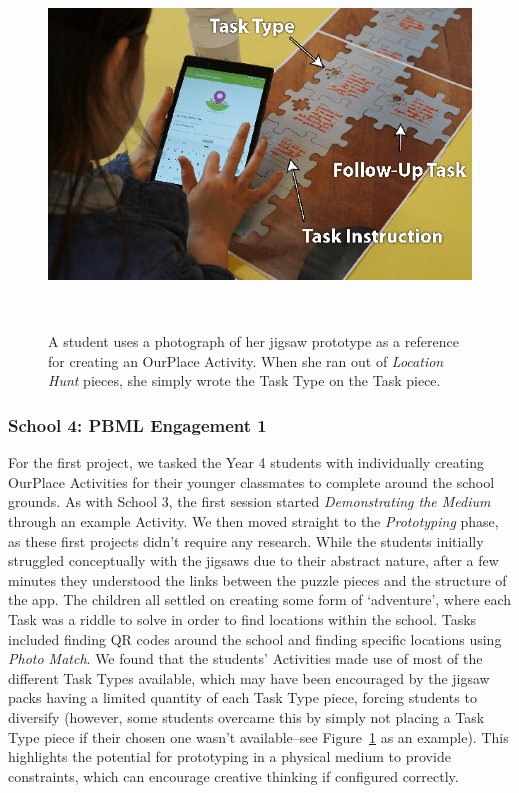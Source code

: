 \begin{figure}
\centering
  \includegraphics[width=0.7\columnwidth]{images/chapter08/jigsawToApp}
  \caption[A student referring to her paper prototype]{A student uses a photograph of her jigsaw prototype as a reference for creating an OurPlace Activity. When she ran out of \textit{Location Hunt} pieces, she simply wrote the Task Type on the Task piece.}~\label{fig:JigsawToApp}
\end{figure}

\subsubsection{School 4: PBML Engagement 1}
For the first project, we tasked the Year 4 students with individually creating OurPlace Activities for their younger classmates to complete around the school grounds. As with School 3, the first session started \textit{Demonstrating the Medium} through an example Activity. We then moved straight to the \textit{Prototyping} phase, as these first projects didn't require any research. While the students initially struggled conceptually with the jigsaws due to their abstract nature, after a few minutes they understood the links between the puzzle pieces and the structure of the app. The children all settled on creating some form of `adventure', where each Task was a riddle to solve in order to find locations within the school. Tasks included finding QR codes around the school and finding specific locations using \textit{Photo Match}. We found that the students' Activities made use of most of the different Task Types available, which may have been encouraged by the jigsaw packs having a limited quantity of each Task Type piece, forcing students to diversify (however, some students overcame this by simply not placing a Task Type piece if their chosen one wasn't available--see Figure~\ref{fig:JigsawToApp} as an example). This highlights the potential for prototyping in a physical medium to provide constraints, which can encourage creative thinking if configured correctly.

